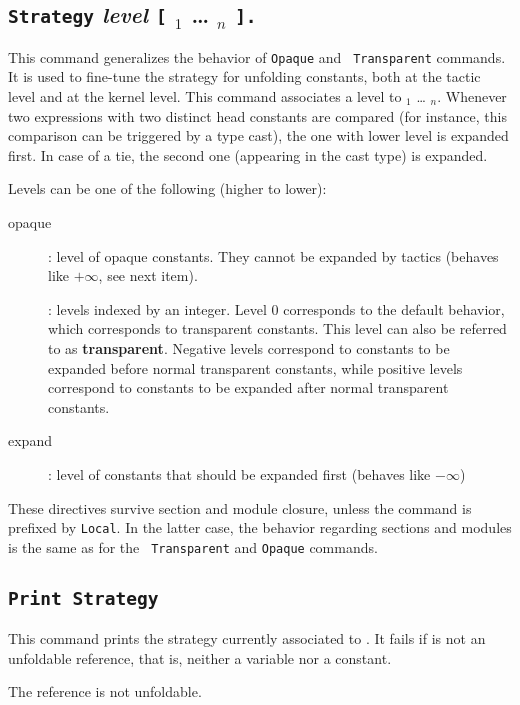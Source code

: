 \subsection{{\tt Strategy} {\it level} {\tt [} \qualid$_1$ {\ldots} \qualid$_n$
  {\tt ].}\label{Strategy}}
This command generalizes the behavior of {\tt Opaque} and {\tt
  Transparent} commands. It is used to fine-tune the strategy for
unfolding constants, both at the tactic level and at the kernel
level. This command associates a level to \qualid$_1$ {\ldots}
\qualid$_n$. Whenever two expressions with two distinct head
constants are compared (for instance, this comparison can be triggered
by a type cast), the one with lower level is expanded first. In case
of a tie, the second one (appearing in the cast type) is expanded.

Levels can be one of the following (higher to lower):
\begin{description}
\item[opaque]: level of opaque constants. They cannot be expanded by
  tactics (behaves like $+\infty$, see next item).
\item[\num]: levels indexed by an integer. Level $0$ corresponds
  to the default behavior, which corresponds to transparent
  constants. This level can also be referred to as {\bf transparent}.
  Negative levels correspond to constants to be expanded before normal
  transparent constants, while positive levels correspond to constants
  to be expanded after normal transparent constants.
\item[expand]: level of constants that should be expanded first
  (behaves like $-\infty$)
\end{description}

These directives survive section and module closure, unless the
command is prefixed by {\tt Local}. In the latter case, the behavior
regarding sections and modules is the same as for the {\tt
  Transparent} and {\tt Opaque} commands.

\subsection{{\tt Print Strategy} \label{PrintStrategy}}

This command prints the strategy currently associated to \qualid{}. It fails if
\qualid{} is not an unfoldable reference, that is, neither a variable nor a
constant.

\begin{ErrMsgs}
\item The reference is not unfoldable.
\end{ErrMsgs}

